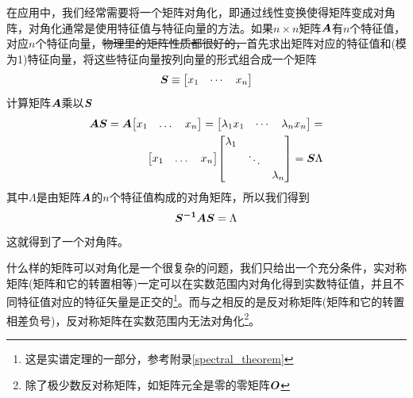 \documentclass[12pt,a4paper,openany,twoside]{book}
\numberwithin{equation}{section}
\begin{document}
          在应用中，我们经常需要将一个矩阵对角化，即通过线性变换使得矩阵变成对角阵，对角化通常是使用特征值与特征向量的方法。如果$n\times n$矩阵$\vb*{A}$有$n$个特征值，对应$n$个特征向量，\sout{物理里的矩阵性质都很好的，}首先求出矩阵对应的特征值和(模为1)特征向量，将这些特征向量按列向量的形式组合成一个矩阵
          \begin{equation*}
            \vb*{S}\equiv\mqty[x_1 & \cdots & x_n]
          \end{equation*}
          计算矩阵$\vb*{A}$乘以$\vb*{S}$
          \begin{equation}
            \begin{aligned}
              \vb*{A S}=\vb*{A}\mqty[x_1 & \dots & x_n]=\mqty[\lambda_1 x_1 & \cdots & \lambda_n x_n]= \\
              \mqty[x_1 & \dots & x_n] \mqty[
                \lambda_1 & {} & {} \\
                {} & \ddots & {} \\
                {} & {} & \lambda_n
              ]=\vb*{S }\Lambda
            \end{aligned}
          \end{equation}
          其中$\Lambda$是由矩阵$\vb*{A}$的$n$个特征值构成的对角矩阵，所以我们得到
          \begin{equation}
            \vb*{S^{-1}AS}=\Lambda
          \end{equation}
          这就得到了一个对角阵。

          什么样的矩阵可以对角化是一个很复杂的问题，我们只给出一个充分条件，实对称矩阵(矩阵和它的转置相等)一定可以在实数范围内对角化得到实数特征值，并且不同特征值对应的特征矢量是正交的\footnote{这是实谱定理的一部分，参考附录\ref{spectral_theorem}}。而与之相反的是反对称矩阵(矩阵和它的转置相差负号)，反对称矩阵在实数范围内无法对角化\footnote{除了极少数反对称矩阵，如矩阵元全是零的零矩阵$\vb*{O}$}。
    
\end{document}
